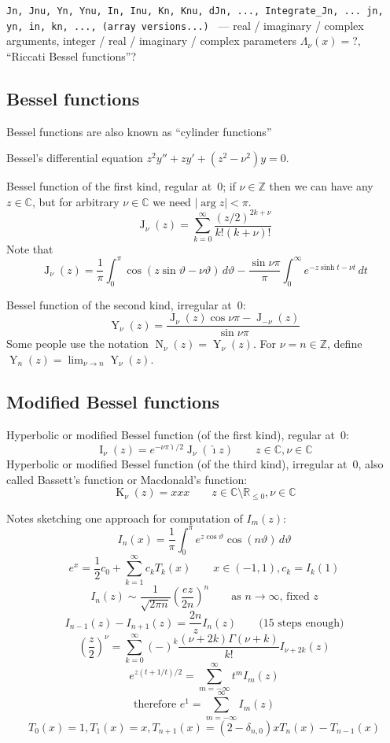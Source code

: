 \documentclass[10pt,dvipdfmx,letterpaper,twoside]{article}
\let\O=\operatorname
\newcommand{\RR}{{\mathbb{R}}}
\newcommand{\CC}{{\mathbb{C}}}
\newcommand{\ZZ}{{\mathbb{Z}}}
\newcommand{\ii}{{\hat{\imath}}}
\let\Gam=\Gamma
\let\theta=\vartheta
\begin{document}
{\tt Jn, Jnu, Yn, Ynu, In, Inu, Kn, Knu, dJn, ..., Integrate\_Jn, ...
jn, yn, in, kn, ..., (array versions...)
} --- real / imaginary / complex arguments, integer / real / imaginary / complex parameters
$\Lambda_\nu(x) = $?, ``Riccati Bessel functions''?

\subsection{Bessel functions}
Bessel functions are also known as ``cylinder functions''

Bessel's differential equation $z^2 y'' + z y' + (z^2-\nu^2) y = 0$.

Bessel function of the first kind, regular at~$0$; if $\nu\in\ZZ$ then we can have any $z\in\CC$, but
for arbitrary $\nu\in\CC$ we need $|\arg z|<\pi$.
\[ \O{J}_\nu(z) = \sum_{k=0}^\infty\frac{(z/2)^{2k+\nu}}{k!(k+\nu)!} \]
Note that
\[ \O{J}_\nu(z) = \frac{1}{\pi}\int_0^\pi\cos(z \sin\theta - \nu\theta)\,d\theta
  - \frac{\sin \nu\pi}{\pi}\int_0^\infty e^{-z \sinh t - \nu t}\,dt \]

Bessel function of the second kind, irregular at~$0$:
\[ \O{Y}_\nu(z) = \frac{\O{J}_\nu(z)\cos\nu\pi - \O{J}_{-\nu}(z)}{\sin \nu\pi} \]
Some people use the notation $\O{N}_\nu(z) = \O{Y}_\nu(z)$.
For $\nu=n\in\ZZ$, define $\O{Y}_n(z) = \lim_{\nu\to n}\O{Y}_\nu(z)$.

\subsection{Modified Bessel functions}

Hyperbolic or modified Bessel function (of the first kind), regular at~$0$:
\[ \O{I}_\nu(z) = e^{-\nu\pi\ii/2} \O{J}_\nu(\ii z) \qquad z\in\CC, \nu\in\CC \]
Hyperbolic or modified Bessel function (of the third kind), irregular at~$0$, also called Bassett's function or Macdonald's function:
\[ \O{K}_\nu(z) = xxx \qquad z\in\CC\setminus\RR_{\leq0}, \nu\in\CC \]

Notes sketching one approach for computation of $I_m(z)$:
\[ I_n(x) = \frac{1}{\pi} \int_0^\pi e^{z\cos\theta} \cos(n\theta)\,d\theta \]
\[ e^{x} = \frac12 c_0 + \sum_{k=1}^\infty c_k T_k(x) \qquad x\in(-1,1), c_k = I_k(1) \]
\[ I_n(z) \sim \frac{1}{\sqrt{2\pi n}}\left(\frac{ez}{2n}\right)^n \qquad\text{as $n\to\infty$, fixed $z$} \]
\[ I_{n-1}(z) - I_{n+1}(z) = \frac{2n}{z} I_n(z) \qquad\text{(15 steps enough)} \]
\[ \left(\frac{z}{2}\right)^{\nu} = \sum_{k=0}^\infty(-)^k \frac{(\nu+2k)\Gam(\nu+k)}{k!} I_{\nu+2k}(z) \]
\[ e^{z(t+1/t)/2} = \sum_{m=-\infty}^\infty t^m I_m(z) \]
\[ \text{therefore\ } e^1 = \sum_{m=-\infty}^\infty I_m(z) \]
\[ T_0(x) = 1, T_1(x) = x, T_{n+1}(x) = (2-\delta_{n,0})x T_{n}(x) - T_{n-1}(x) \]
\end{document}
